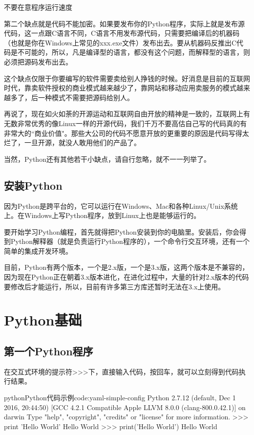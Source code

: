 不要在意程序运行速度

第二个缺点就是代码不能加密。如果要发布你的Python程序，实际上就是发布源代码，这一点跟C语言不同，C语言不用发布源代码，只需要把编译后的机器码（也就是你在Windows上常见的xxx.exe文件）发布出去。要从机器码反推出C代码是不可能的，所以，凡是编译型的语言，都没有这个问题，而解释型的语言，则必须把源码发布出去。

这个缺点仅限于你要编写的软件需要卖给别人挣钱的时候。好消息是目前的互联网时代，靠卖软件授权的商业模式越来越少了，靠网站和移动应用卖服务的模式越来越多了，后一种模式不需要把源码给别人。

再说了，现在如火如荼的开源运动和互联网自由开放的精神是一致的，互联网上有无数非常优秀的像Linux一样的开源代码，我们千万不要高估自己写的代码真的有非常大的``商业价值"。那些大公司的代码不愿意开放的更重要的原因是代码写得太烂了，一旦开源，就没人敢用他们的产品了。

当然，Python还有其他若干小缺点，请自行忽略，就不一一列举了。

\subsection{安装Python}
因为Python是跨平台的，它可以运行在Windows、Mac和各种Linux/Unix系统上。在Windows上写Python程序，放到Linux上也是能够运行的。

要开始学习Python编程，首先就得把Python安装到你的电脑里。安装后，你会得到Python解释器（就是负责运行Python程序的），一个命令行交互环境，还有一个简单的集成开发环境。

目前，Python有两个版本，一个是2.x版，一个是3.x版，这两个版本是不兼容的，因为现在Python正在朝着3.x版本进化，在进化过程中，大量的针对2.x版本的代码要修改后才能运行，所以，目前有许多第三方库还暂时无法在3.x上使用。

\section{Python基础}
\subsection{第一个Python程序}
在交互式环境的提示符>>>下，直接输入代码，按回车，就可以立刻得到代码执行结果。
\begin{jcode}{python}{Python代码示例}{code:yaml-simple-config}
Python 2.7.12 (default, Dec  1 2016, 20:44:50) 
[GCC 4.2.1 Compatible Apple LLVM 8.0.0 (clang-800.0.42.1)] on darwin
Type "help", "copyright", "credits" or "license" for more information.
>>> print 'Hello World'
Hello World
>>> print('Hello World')
Hello World
\end{jcode}

